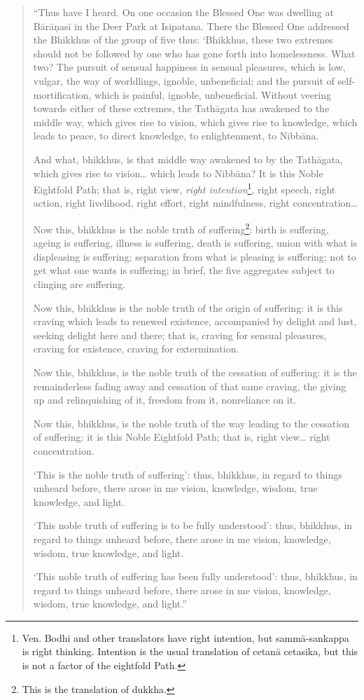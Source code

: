 \begin{quote}
``Thus have I heard. On one occasion the Blessed One was dwelling at
Bārāṇasī in the Deer Park at Isipatana. There the Blessed One addressed
the Bhikkhus of the group of five thus: `Bhikkhus, these two extremes
should not be followed by one who has gone forth into homelessness. What
two? The pursuit of sensual happiness in sensual pleasures, which is
low, vulgar, the way of worldlings, ignoble, unbeneficial; and the
pursuit of self-mortification, which is painful, ignoble, unbeneficial.
Without veering towards either of these extremes, the Tathāgata has
awakened to the middle way, which gives rise to vision, which gives rise
to knowledge, which leads to peace, to direct knowledge, to
enlightenment, to Nibbāna.

And what, bhikkhus, is that middle way awakened to by the Tathāgata,
which gives rise to vision\ldots{} which leads to Nibbāna? It is this
Noble Eightfold Path; that is, right view, \textit{right
intention}\footnote{Ven. Bodhi and other
translators have right intention, but sammā-sankappa is right thinking.
Intention is the usual translation of cetanā cetasika, but this is not a
factor of the eightfold Path.}, right speech,
right action, right livelihood, right effort, right mindfulness, right
concentration\ldots{}

Now this, bhikkhus is the noble truth of
suffering\footnote{This is the
translation of dukkha.}: birth is
suffering, ageing is suffering, illness is suffering, death is
suffering, union with what is displeasing is suffering; separation from
what is pleasing is suffering; not to get what one wants is suffering;
in brief, the five aggregates subject to clinging are suffering.

Now this, bhikkhus is the noble truth of the origin of suffering: it is
this craving which leads to renewed existence, accompanied by delight
and lust, seeking delight here and there; that is, craving for sensual
pleasures, craving for existence, craving for extermination.

Now this, bhikkhus, is the noble truth of the cessation of suffering: it
is the remainderless fading away and cessation of that same craving, the
giving up and relinquishing of it, freedom from it, nonreliance on it.

Now this, bhikkhus, is the noble truth of the way leading to the
cessation of suffering: it is this Noble Eightfold Path; that is, right
view\ldots{} right concentration.

`This is the noble truth of suffering': thus, bhikkhus, in regard to
things unheard before, there arose in me vision, knowledge, wisdom, true
knowledge, and light.

`This noble truth of suffering is to be fully understood': thus,
bhikkhus, in regard to things unheard before, there arose in me vision,
knowledge, wisdom, true knowledge, and light.

`This noble truth of suffering has been fully understood': thus,
bhikkhus, in regard to things unheard before, there arose in me vision,
knowledge, wisdom, true knowledge, and light.''
\end{quote}

